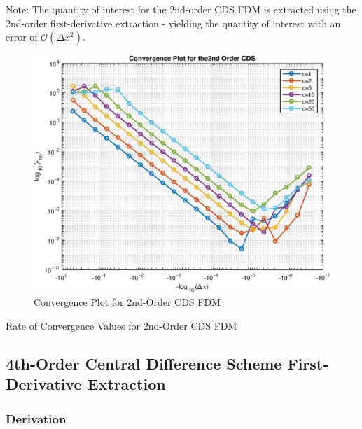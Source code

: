 \documentclass[10pt, reqno]{article}		%
\numberwithin{equation}{section}
\begin{document}
Note: The quantity of interest for the 2nd-order CDS FDM is extracted using the 2nd-order first-derivative extraction - yielding the quantity of interest with an error of $\mathcal{O}(\Delta x^2)$.

\begin{figure}[H]
	\begin{center}
		\includegraphics[width = 0.57\linewidth]{convergence_2nd_order_cds}
		\caption{Convergence Plot for 2nd-Order CDS FDM}	
	\end{center}
\end{figure}

\begin{table}[H]
	
	\caption{Rate of Convergence Values for 2nd-Order CDS FDM}	
\end{table}

\newpage

\subsection{4th-Order Central Difference Scheme First-Derivative Extraction}

\subsubsection{Derivation}
\end{document}
